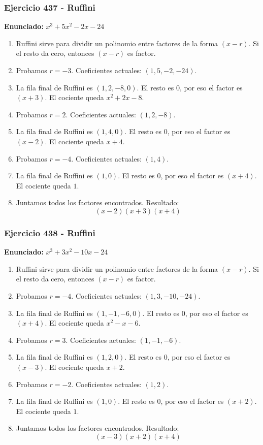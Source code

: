 \documentclass[11pt,a4paper]{article}
\begin{document}
\vspace{0.2cm}
\subsubsection*{Ejercicio 437 - Ruffini}
\textbf{Enunciado:} $ x^{3} + 5 x^{2} - 2 x - 24 $\par
\begin{enumerate}[leftmargin=2em]
\item Ruffini sirve para dividir un polinomio entre factores de la forma \((x-r)\). Si el resto da cero, entonces \((x-r)\) es factor.
\item Probamos \(r=-3\). Coeficientes actuales: \((1, 5, -2, -24)\).
\item La fila final de Ruffini es \((1, 2, -8, 0)\). El resto es \(0\), por eso el factor es \((x+3)\). El cociente queda \(x^{2} + 2 x - 8\).
\item Probamos \(r=2\). Coeficientes actuales: \((1, 2, -8)\).
\item La fila final de Ruffini es \((1, 4, 0)\). El resto es \(0\), por eso el factor es \((x-2)\). El cociente queda \(x + 4\).
\item Probamos \(r=-4\). Coeficientes actuales: \((1, 4)\).
\item La fila final de Ruffini es \((1, 0)\). El resto es \(0\), por eso el factor es \((x+4)\). El cociente queda \(1\).
\item Juntamos todos los factores encontrados. Resultado: \[\boxed{\left(x - 2\right) \left(x + 3\right) \left(x + 4\right)}\]
\end{enumerate}

\vspace{0.2cm}
\subsubsection*{Ejercicio 438 - Ruffini}
\textbf{Enunciado:} $ x^{3} + 3 x^{2} - 10 x - 24 $\par
\begin{enumerate}[leftmargin=2em]
\item Ruffini sirve para dividir un polinomio entre factores de la forma \((x-r)\). Si el resto da cero, entonces \((x-r)\) es factor.
\item Probamos \(r=-4\). Coeficientes actuales: \((1, 3, -10, -24)\).
\item La fila final de Ruffini es \((1, -1, -6, 0)\). El resto es \(0\), por eso el factor es \((x+4)\). El cociente queda \(x^{2} - x - 6\).
\item Probamos \(r=3\). Coeficientes actuales: \((1, -1, -6)\).
\item La fila final de Ruffini es \((1, 2, 0)\). El resto es \(0\), por eso el factor es \((x-3)\). El cociente queda \(x + 2\).
\item Probamos \(r=-2\). Coeficientes actuales: \((1, 2)\).
\item La fila final de Ruffini es \((1, 0)\). El resto es \(0\), por eso el factor es \((x+2)\). El cociente queda \(1\).
\item Juntamos todos los factores encontrados. Resultado: \[\boxed{\left(x - 3\right) \left(x + 2\right) \left(x + 4\right)}\]
\end{enumerate}
\end{document}
